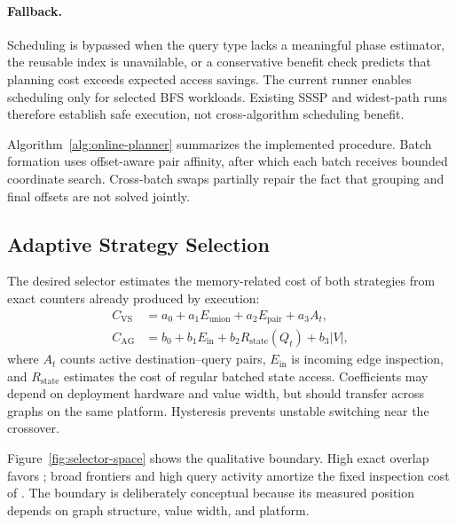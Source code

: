 \paragraph{Fallback.}
Scheduling is bypassed when the query type lacks a meaningful phase estimator, the reusable index is unavailable, or a conservative benefit check predicts that planning cost exceeds expected access savings.  The current runner enables scheduling only for selected BFS workloads.  Existing SSSP and widest-path runs therefore establish safe execution, not cross-algorithm scheduling benefit.

Algorithm~\ref{alg:online-planner} summarizes the implemented procedure.  Batch formation uses offset-aware pair affinity, after which each batch receives bounded coordinate search.  Cross-batch swaps partially repair the fact that grouping and final offsets are not solved jointly.



\subsection{Adaptive Strategy Selection}
\label{sec:selector}

The desired selector estimates the memory-related cost of both strategies from exact counters already produced by execution:
\begin{align}
 C_{\mathrm{VS}} &= a_0 + a_1 E_{\mathrm{union}}
                    +a_2 E_{\mathrm{pair}}+a_3 A_t, \\
 C_{\mathrm{AG}} &= b_0 + b_1 E_{\mathrm{in}}
                    +b_2 R_{\mathrm{state}}(Q_t)+b_3 |V|,
\end{align}
where $A_t$ counts active destination--query pairs, $E_{\mathrm{in}}$ is incoming edge inspection, and $R_{\mathrm{state}}$ estimates the cost of regular batched state access.  Coefficients may depend on deployment hardware and value width, but should transfer across graphs on the same platform.  Hysteresis prevents unstable switching near the crossover.

Figure~\ref{fig:selector-space} shows the qualitative boundary.  High exact overlap favors \sharedexpand; broad frontiers and high query activity amortize the fixed inspection cost of \coalescedgather.  The boundary is deliberately conceptual because its measured position depends on graph structure, value width, and platform.



